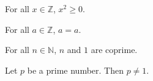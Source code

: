 
\begin{theorem}
For all $x \in \mathbb{Z}$, $x^2 \geq 0$.
\end{theorem}

\begin{theorem}
For all $a \in \mathbb{Z}$, $a = a$.
\end{theorem}

\begin{theorem}
For all $n \in \mathbb{N}$, $n$ and $1$ are coprime.
\end{theorem}

\begin{theorem}
Let $p$ be a prime number. Then $p \neq 1$.
\end{theorem}
